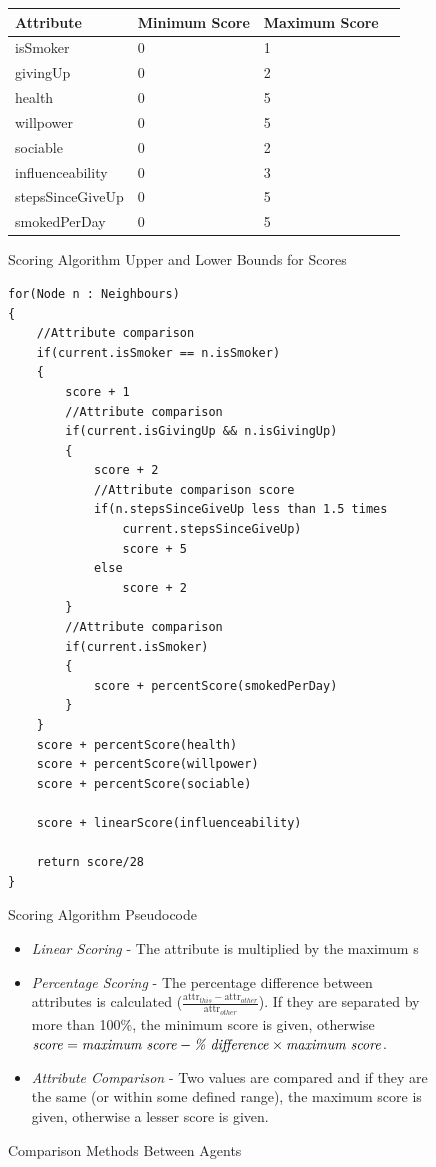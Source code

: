 \documentclass[]{report}
\begin{document}
\begin{figure}
\begin{center}
\label{tab:reconfig}
\begin{tabular}{|l||l|l|l|}
\hline
\bf{Attribute} & \bf{Minimum Score} & \bf{Maximum Score}\\
\hline
isSmoker 						& 0	&	1\\
givingUp						&	0	&	2\\
health							&	0	& 5\\
willpower						&	0	&	5\\
sociable						&	0	&	2\\
influenceability		&	0	&	3\\
stepsSinceGiveUp		&	0	&	5\\
smokedPerDay				&	0	&	5\\

\hline

\end{tabular}
\end{center}
\caption{Scoring Algorithm Upper and Lower Bounds for Scores}
\end{figure}

\begin{figure}
\begin{center}
	\begin{lstlisting}
for(Node n : Neighbours)
{
	//Attribute comparison
	if(current.isSmoker == n.isSmoker)
	{
		score + 1
		//Attribute comparison
		if(current.isGivingUp && n.isGivingUp)
		{
			score + 2
			//Attribute comparison score
			if(n.stepsSinceGiveUp less than 1.5 times 
				current.stepsSinceGiveUp)
				score + 5
			else
				score + 2
		}
		//Attribute comparison
		if(current.isSmoker)
		{
			score + percentScore(smokedPerDay) 
		}
	}
	score + percentScore(health)
	score + percentScore(willpower)
	score + percentScore(sociable)

	score + linearScore(influenceability)

	return score/28
}
	\end{lstlisting}
\end{center}
\label{code:scoring}
\caption{Scoring Algorithm Pseudocode}
\end{figure}

\begin{figure}
\label{code:comp-methods}
\begin{itemize}
\item \emph{Linear Scoring} - The attribute is multiplied by the maximum s
\item \emph{Percentage Scoring} - The percentage difference between attributes is calculated ($\frac{\text{attr}_{this}-\text{attr}_{other}}{\text{attr}_{other}}$). If they are separated by more than 100\%, the minimum score is given, otherwise $\text{\emph{score}} = \text{\emph{maximum score}} - \text{\emph{\% difference}} \times \text{\emph{maximum score}}$.
\item \emph{Attribute Comparison} - Two values are compared and if they are the same (or within some defined range), the maximum score is given, otherwise a lesser score is given.
\end{itemize}
\caption{Comparison Methods Between Agents}
\end{figure}
\end{document}
